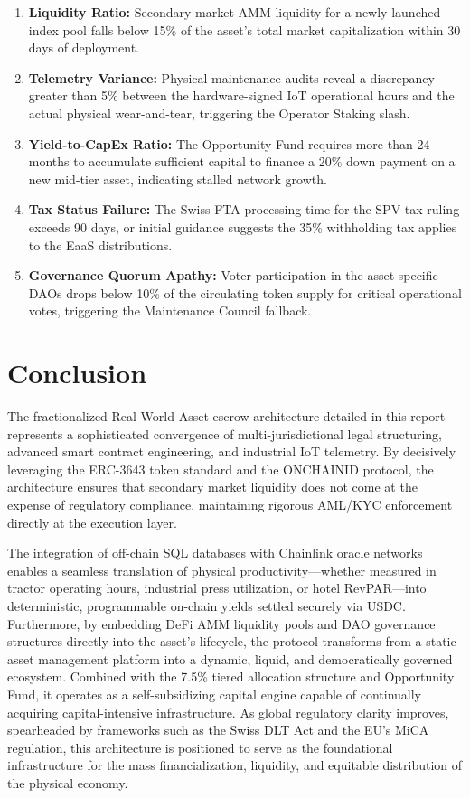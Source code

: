 \documentclass[12pt, a4paper]{article}
\begin{document}
\begin{enumerate}
    \item \textbf{Liquidity Ratio:} Secondary market AMM liquidity for a newly launched index pool falls below 15\% of the asset's total market capitalization within 30 days of deployment.
    \item \textbf{Telemetry Variance:} Physical maintenance audits reveal a discrepancy greater than 5\% between the hardware-signed IoT operational hours and the actual physical wear-and-tear, triggering the Operator Staking slash.
    \item \textbf{Yield-to-CapEx Ratio:} The Opportunity Fund requires more than 24 months to accumulate sufficient capital to finance a 20\% down payment on a new mid-tier asset, indicating stalled network growth.
    \item \textbf{Tax Status Failure:} The Swiss FTA processing time for the SPV tax ruling exceeds 90 days, or initial guidance suggests the 35\% withholding tax applies to the EaaS distributions.
    \item \textbf{Governance Quorum Apathy:} Voter participation in the asset-specific DAOs drops below 10\% of the circulating token supply for critical operational votes, triggering the Maintenance Council fallback.
\end{enumerate}

\section{Conclusion}
The fractionalized Real-World Asset escrow architecture detailed in this report represents a sophisticated convergence of multi-jurisdictional legal structuring, advanced smart contract engineering, and industrial IoT telemetry. By decisively leveraging the ERC-3643 token standard and the ONCHAINID protocol, the architecture ensures that secondary market liquidity does not come at the expense of regulatory compliance, maintaining rigorous AML/KYC enforcement directly at the execution layer.

The integration of off-chain SQL databases with Chainlink oracle networks enables a seamless translation of physical productivity—whether measured in tractor operating hours, industrial press utilization, or hotel RevPAR—into deterministic, programmable on-chain yields settled securely via USDC. Furthermore, by embedding DeFi AMM liquidity pools and DAO governance structures directly into the asset's lifecycle, the protocol transforms from a static asset management platform into a dynamic, liquid, and democratically governed ecosystem. Combined with the 7.5\% tiered allocation structure and Opportunity Fund, it operates as a self-subsidizing capital engine capable of continually acquiring capital-intensive infrastructure. As global regulatory clarity improves, spearheaded by frameworks such as the Swiss DLT Act and the EU's MiCA regulation, this architecture is positioned to serve as the foundational infrastructure for the mass financialization, liquidity, and equitable distribution of the physical economy.
\end{document}
